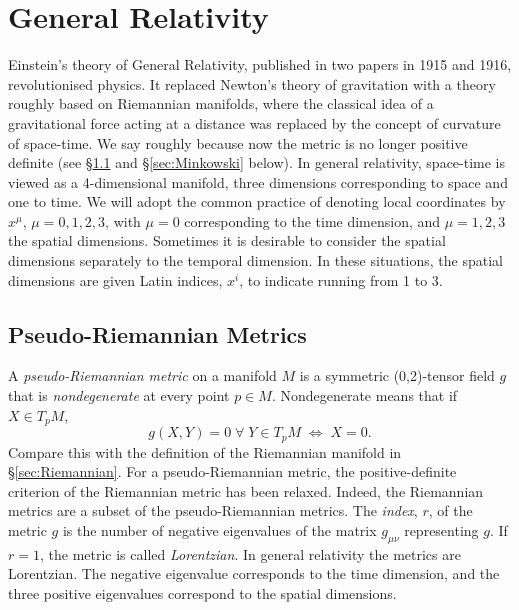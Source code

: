 %

%

\chapter{General Relativity}

Einstein's theory of General Relativity, published in two papers in 1915 and 1916, revolutionised physics. It replaced Newton's theory of gravitation with a theory roughly based on Riemannian manifolds, where the classical idea of a gravitational force acting at a distance was replaced by the concept of curvature of space-time. We say roughly because now the metric is no longer positive definite (see {\S}\ref{sec:Pseudo} and {\S}\ref{sec:Minkowski} below). In general relativity, space-time is viewed as a 4-dimensional manifold, three dimensions corresponding to space and one to time. We will adopt the common practice of denoting local coordinates by $x^\mu$, $\mu=0,1,2,3$, with $\mu=0$ corresponding to the time dimension, and $\mu=1,2,3$ the spatial dimensions. Sometimes it is desirable to consider the spatial dimensions separately to the temporal dimension. In these situations, the spatial dimensions are given Latin indices, $x^i$, to indicate running from 1 to 3. \\

\section{Pseudo-Riemannian Metrics}\label{sec:Pseudo}
A \textit{pseudo-Riemannian metric} on a manifold $M$ is a symmetric (0,2)-tensor field $g$ that is \textit{nondegenerate} at every point $p\in M$. Nondegenerate means that if $X\in T_pM$,
\[ g(X,Y)=0\; \forall\; Y\in T_p M\; \Leftrightarrow\; X=0. \]
Compare this with the definition of the Riemannian manifold in {\S}\ref{sec:Riemannian}. For a pseudo-Riemannian metric, the positive-definite criterion of the Riemannian metric has been relaxed. Indeed, the Riemannian metrics are a subset of the pseudo-Riemannian metrics. The \textit{index}, $r$, of the metric $g$ is the number of negative eigenvalues of the matrix $g_{\mu \nu}$ representing $g$. If $r=1$, the metric is called \textit{Lorentzian}. In general relativity the metrics are Lorentzian. The negative eigenvalue corresponds to the time dimension, and the three positive eigenvalues correspond to the spatial dimensions.\\


